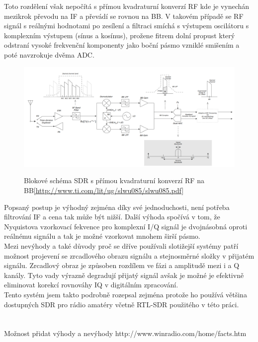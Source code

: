 \documentclass{ctuthesis}
\begin{document}
Toto rozdělení však nepočítá s přímou kvadraturní konverzí RF kde je vynechán mezikrok převodu na IF a převádí se rovnou na BB. V takovém případě se RF signál s reálnými hodnotami po zesílení a filtraci smíchá s výstupem oscilátoru s komplexním výstupem (sínus a kosínus), prožene fitrem dolní propust který odstraní vysoké frekvenční komponenty jako boční pásmo vzniklé smišením a poté navzrokuje dvěma ADC.\\
\begin{figure}
\caption{Blokové schéma SDR s přímou kvadraturní konverzí RF na BB\ref{http://www.ti.com/lit/ug/slwu085/slwu085.pdf}}
\includegraphics[width=1\textwidth]{./images/principSDR.png}
\label{principSDR}
\end{figure}
Popsaný postup je výhodný zejména díky své jednoduchosti, není potřeba filtrování IF a cena tak může být nižší. Další výhoda spočívá v tom, že Nyquistova vzorkovací fekvence pro komplexní I/Q signál je dvojnásobná oproti reálnému signálu a tak je možné vzorkovat mnohem širší pásmo.\\
Mezi nevýhody a také důvody proč se dříve používali slotižejší systémy patří možnost projevení se zrcadlového obrazu signálu a stejnosměrné složky v přijatém signálu. Zrcadlový obraz je způsoben rozdílem ve fázi a amplitudě mezi i a Q kanály. Tyto vady výrazně degradují přijatý signál avšak je možné je efektivně eliminovat korekcí rovnováhy IQ v digitálním zpracování.\\
Tento systém jsem takto podrobně rozepsal zejména protože ho používá většina dostupných SDR pro rádio amatéry včetně RTL-SDR použitého v této práci.
\\\\\\
Možnost přidat výhody a nevýhody http://www.winradio.com/home/facts.htm
\end{document}
